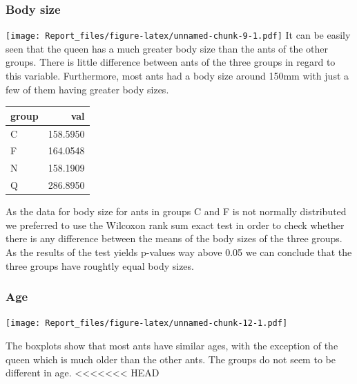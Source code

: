 \documentclass[
]{article}
\newenvironment{Shaded}{\begin{snugshade}}{\end{snugshade}}
\newcommand{\DataTypeTok}[1]{\textcolor[rgb]{0.13,0.29,0.53}{#1}}
\newcommand{\DecValTok}[1]{\textcolor[rgb]{0.00,0.00,0.81}{#1}}
\newcommand{\KeywordTok}[1]{\textcolor[rgb]{0.13,0.29,0.53}{\textbf{#1}}}
\newcommand{\NormalTok}[1]{#1}
\newcommand{\OperatorTok}[1]{\textcolor[rgb]{0.81,0.36,0.00}{\textbf{#1}}}
\newcommand{\StringTok}[1]{\textcolor[rgb]{0.31,0.60,0.02}{#1}}
\begin{document}
\hypertarget{body-size}{%
\subsubsection{Body size}\label{body-size}}

\texttt{[image: Report\_files/figure-latex/unnamed-chunk-9-1.pdf]} It can
be easily seen that the queen has a much greater body size than the ants
of the other groups. There is little difference between ants of the
three groups in regard to this variable. Furthermore, most ants had a
body size around 150mm with just a few of them having greater body
sizes.

\begin{longtable}[]{@{}lr@{}}
\toprule
group & val\tabularnewline
\midrule
\endhead
C & 158.5950\tabularnewline
F & 164.0548\tabularnewline
N & 158.1909\tabularnewline
Q & 286.8950\tabularnewline
\bottomrule
\end{longtable}

As the data for body size for ants in groups C and F is not normally
distributed we preferred to use the Wilcoxon rank sum exact test in
order to check whether there is any difference between the means of the
body sizes of the three groups. As the results of the test yields
p-values way above 0.05 we can conclude that the three groups have
roughtly equal body sizes.

\hypertarget{age}{%
\subsubsection{Age}\label{age}}

\texttt{[image: Report\_files/figure-latex/unnamed-chunk-12-1.pdf]}

The boxplots show that most ants have similar ages, with the exception
of the queen which is much older than the other ants. The groups do not
seem to be different in age.
\textless\textless\textless\textless\textless\textless\textless{} HEAD

\begin{Shaded}
\end{Shaded}
\end{document}
